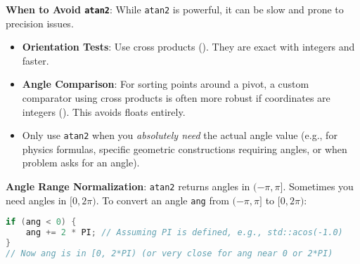 \begin{tipsbox}
\label{tips:A.3.3.atan2_alternatives}
\textbf{When to Avoid \texttt{atan2}}:
While \texttt{atan2} is powerful, it can be slow and prone to precision issues.
\begin{itemize}
    \item \textbf{Orientation Tests}: Use cross products (). They are exact with integers and faster.
    \item \textbf{Angle Comparison}: For sorting points around a pivot, a custom comparator using cross products is often more robust if coordinates are integers (). This avoids floats entirely.
    \item Only use \texttt{atan2} when you \textit{absolutely need} the actual angle value (e.g., for physics formulas, specific geometric constructions requiring angles, or when problem asks for an angle).
\end{itemize}
\end{tipsbox}

\begin{gotcha}
\label{gotcha:A.3.3.angle_range_conversion}
\textbf{Angle Range Normalization}: \texttt{atan2} returns angles in $(-\pi, \pi]$. Sometimes you need angles in $[0, 2\pi)$.
To convert an angle \texttt{ang} from $(-\pi, \pi]$ to $[0, 2\pi)$:
\begin{lstlisting}[language=C++, caption=Angle Range Conversion]
if (ang < 0) {
    ang += 2 * PI; // Assuming PI is defined, e.g., std::acos(-1.0)
}
// Now ang is in [0, 2*PI) (or very close for ang near 0 or 2*PI)
\end{lstlisting}
\end{gotcha}
